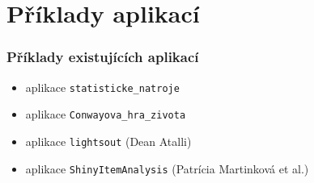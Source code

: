 \documentclass[t]{beamer}
\begin{document}
\section{Příklady aplikací}


\begin{frame}
  \frametitle{Příklady existujících aplikací}
  \begin{itemize}
    \item aplikace \texttt{statisticke\_natroje}
  \end{itemize}
  \begin{center}
    \href{http://shiny.statest.cz:3838/statisticke\_nastroje/}{%
    }
  \end{center}
  \begin{itemize}
    \item aplikace \texttt{Conwayova\_hra\_zivota}
  \end{itemize}
  \begin{center}
    \href{http://shiny.statest.cz:3838/Conwayova\_hra\_zivota/}{%
    }
  \end{center}
  \begin{itemize}
    \item aplikace \texttt{lightsout} (Dean Atalli)
  \end{itemize}
  \begin{center}
    \href{http://shiny.statest.cz:3838/lightsout/}{%
    }
  \end{center}
  \begin{itemize}
    \item aplikace \texttt{ShinyItemAnalysis} (Patrícia Martinková et al.)
  \end{itemize}
  \begin{center}
    \href{http://shiny.statest.cz:3838/ShinyItemAnalysis/}{%
    }
  \end{center}
\end{frame}


\end{document}
